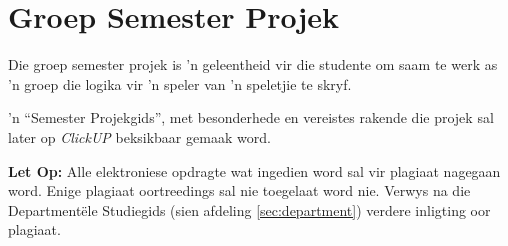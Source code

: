 \section{Groep Semester Projek}
        Die groep semester projek is 'n geleentheid vir die studente om saam te
        werk as 'n groep die logika vir 'n speler van 'n speletjie te skryf.
        
        'n ``Semester Projekgids'', met besonderhede en vereistes rakende die projek
        sal later op \textit{ClickUP} beksikbaar gemaak word.

    \textbf{Let Op:} Alle elektroniese opdragte wat ingedien word sal vir plagiaat
    nagegaan word. Enige plagiaat oortreedings sal nie toegelaat word nie.
    Verwys na die Department\"ele Studiegids (sien afdeling
    \ref{sec:department}) verdere inligting oor plagiaat.

